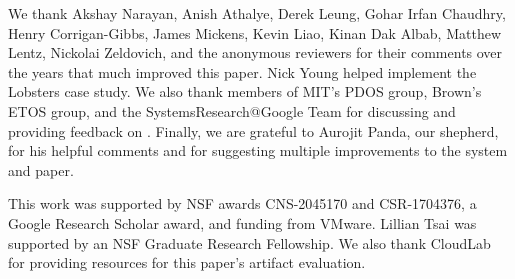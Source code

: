 We thank Akshay Narayan, Anish Athalye, Derek Leung, Gohar Irfan Chaudhry, Henry
Corrigan-Gibbs, James Mickens, Kevin Liao, Kinan Dak Albab, Matthew Lentz,
Nickolai Zeldovich, and the anonymous reviewers for their comments over the
years that much improved this paper. Nick Young helped implement the Lobsters
case study. We also thank members of MIT's PDOS group, Brown's ETOS group, and
the SystemsResearch@Google Team for discussing and providing feedback on \sys.
%
Finally, we are grateful to Aurojit Panda, our shepherd, for his helpful comments and
for suggesting multiple improvements to the system and paper.
%

%
This work was supported by NSF awards CNS-2045170 and CSR-1704376, a Google Research Scholar award,
and funding from VMware.
%
Lillian Tsai was supported by an NSF Graduate Research Fellowship.
%
We also thank CloudLab~\cite{cloudlab} for providing resources for this paper's
artifact evaluation.
